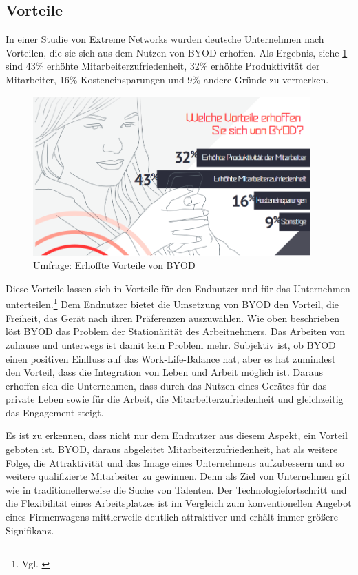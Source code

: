 \subsection{Vorteile}
In einer Studie von Extreme Networks \cite{ext2014} wurden deutsche Unternehmen nach Vorteilen, die sie sich aus dem Nutzen von BYOD erhoffen. Als Ergebnis, siehe \cref{fig:VorBYOD} sind 43\% erhöhte Mitarbeiterzufriedenheit, 32\% erhöhte Produktivität der Mitarbeiter, 16\% Kosteneinsparungen und 9\% andere Gründe zu vermerken.
\begin{figure}[hbt]
\centering
\includegraphics[width=0.95\textwidth]{Bilder/Vorteile_BYOD.png} 
\caption{Umfrage: Erhoffte Vorteile von BYOD}\label{fig:VorBYOD}
\end{figure}
Diese Vorteile lassen sich in Vorteile für den Endnutzer und für das Unternehmen unterteilen.\footnote{Vgl. \cite{fuj2018} } Dem Endnutzer bietet die Umsetzung von BYOD den Vorteil, die Freiheit, das Gerät nach ihren Präferenzen auszuwählen. Wie oben beschrieben löst BYOD das Problem der Stationärität des Arbeitnehmers. Das Arbeiten von zuhause und unterwegs ist damit kein Problem mehr. Subjektiv ist, ob BYOD einen positiven Einfluss auf das Work-Life-Balance hat, aber es hat zumindest den Vorteil, dass die Integration von Leben und Arbeit möglich ist. Daraus erhoffen sich die Unternehmen, dass durch das Nutzen eines Gerätes für das private Leben sowie für die Arbeit, die Mitarbeiterzufriedenheit und gleichzeitig das Engagement steigt.

Es ist zu erkennen, dass nicht nur dem Endnutzer aus diesem Aspekt, ein Vorteil geboten ist. BYOD, daraus abgeleitet Mitarbeiterzufriedenheit, hat als weitere Folge, die Attraktivität und das Image eines Unternehmens aufzubessern und so weitere qualifizierte Mitarbeiter zu gewinnen. Denn als Ziel von Unternehmen gilt wie in traditionellerweise die Suche von Talenten. Der Technologiefortschritt und die Flexibilität eines Arbeitsplatzes ist im Vergleich zum konventionellen Angebot eines Firmenwagens mittlerweile deutlich attraktiver und erhält immer größere Signifikanz. 

